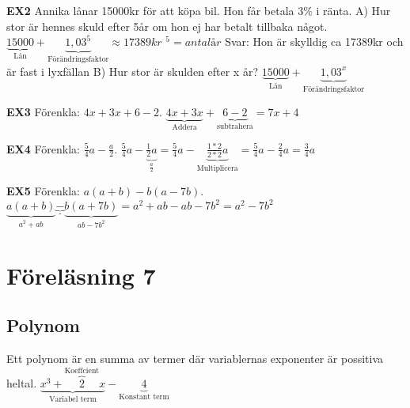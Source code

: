 \documentclass[a4paper,11pt]{article}
\begin{document}
\begin{flushleft}
\textbf{EX2}\newline
Annika lånar 15000kr för att köpa bil. Hon får betala 3\% i ränta.\newline
A) Hur stor är hennes skuld efter 5år om hon ej har betalt tillbaka något.\newline
$ \underbrace{15000}_{\text{Lån}} + \underbrace{1,03^5}_{\text{Förändringsfaktor}} \approx 17389kr $ \newline
\textit{$^5 = antal år$} \newline
Svar: Hon är skylldig ca 17389kr och är fast i lyxfällan \newline\newline
B) Hur stor är skulden efter x år?\newline\newline
$ \underbrace{15000}_{\text{Lån}} + \underbrace{1,03^x}_{\text{Förändringsfaktor}} $\newline\newline

\textbf{EX3}\newline
Förenkla: $4x+3x+6-2$.\newline\newline
$ \underbrace{4x+3x}_{\text{Addera}} + \underbrace{6-2}_{\text{subtrahera}} = 7x+4 $ \newline\newline

\textbf{EX4}\newline
Förenkla: $\frac{5}{4}a-\frac{a}{2}$.\newline\newline
$ \frac{5}{4}a-\underbrace{\frac{1}{2}a}_{\text{$\frac{a}{2}$}} = \frac{5}{4}a-\underbrace{\frac{1*2}{2*2}a}_{\text{Multiplicera}} = \frac{5}{4}a-\frac{2}{4}a = \frac{3}{4}a $\newline\newline

\textbf{EX5}\newline
Förenkla: $a(a+b)-b(a-7b)$.\newline\newline
$\underbrace{a(a+b)}_{\text{$a^2+ab$}} \underbrace{-}_{\text{-}} \underbrace{b(a+7b)}_{\text{$ab-7b^2$}} = a^2+ab-ab-7b^2 = a^2-7b^2 $\newline\newline


\newpage
\section{Föreläsning 7}
\subsection{Polynom}
Ett polynom är en summa av termer där variablernas exponenter är possitiva heltal.\newline
$ \underbrace{x^3+\overbrace{2}^{\text{Koeffcient}}x}_{\text{Variabel term}} - \underbrace{4}_{\text{Konstant term}} $

\end{flushleft}
\end{document}

